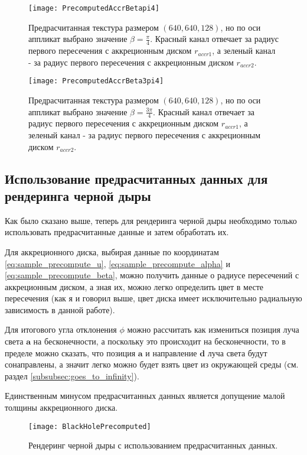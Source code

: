 \newpage

\begin{figure}
    \centering
    \texttt{[image: PrecomputedAccrBetapi4]}
    \caption{Предрасчитанная текстура размером $(640, 640, 128)$, но по оси аппликат выбрано значение $\beta = \frac{\pi}{4}$. Красный канал отвечает за радиус первого пересечения с аккреционным диском $r_{accr1}$, а зеленый канал - за радиус первого пересечения с аккреционным диском $r_{accr2}$.}
    \label{fig:precomputed_accr_beta_1pi4}
\end{figure}

\begin{figure}[h]
    \centering
    \texttt{[image: PrecomputedAccrBeta3pi4]}
    \caption{Предрасчитанная текстура размером $(640, 640, 128)$, но по оси аппликат выбрано значение $\beta = \frac{3\pi}{4}$. Красный канал отвечает за радиус первого пересечения с аккреционным диском $r_{accr1}$, а зеленый канал - за радиус первого пересечения с аккреционным диском $r_{accr2}$.}
    \label{fig:precomputed_accr_beta_3pi4}
\end{figure}

\newpage

\subsection{Использование предрасчитанных данных для рендеринга черной дыры}
\label{subsec:precompute_black_hole_rendering}

Как было сказано выше, теперь для рендеринга черной дыры необходимо только использовать предрасчитанные данные и затем обработать их.

Для аккреционного диска, выбирая данные по координатам \eqref{eq:sample_precompute_u}, \eqref{eq:sample_precompute_alpha} и \eqref{eq:sample_precompute_beta}, можно получить данные о радиусе пересечений с аккреционным диском, а зная их, можно легко определить цвет в месте пересечения (как я и говорил выше, цвет диска имеет исключительно радиальную зависимость в данной работе).

Для итогового угла отклонения $\phi$ можно рассчитать как измениться позиция луча света $\mathbf{a}$ на бесконечности, а поскольку это происходит на бесконечности, то в пределе можно сказать, что позиция $\mathbf{a}$ и направление $\mathbf{d}$ луча света будут сонаправлены, а значит легко можно будет взять цвет из окружающей среды (см. раздел \ref{subsubsec:goes_to_infinity}).

Единственным минусом предрасчитанных данных является допущение малой толщины аккреционного диска.

\begin{figure}[h]
    \centering
    \texttt{[image: BlackHolePrecomputed]}
    \caption{Рендеринг черной дыры с использованием предрасчитанных данных.}
    \label{fig:black_hole_precomputed}
\end{figure}

\newpage